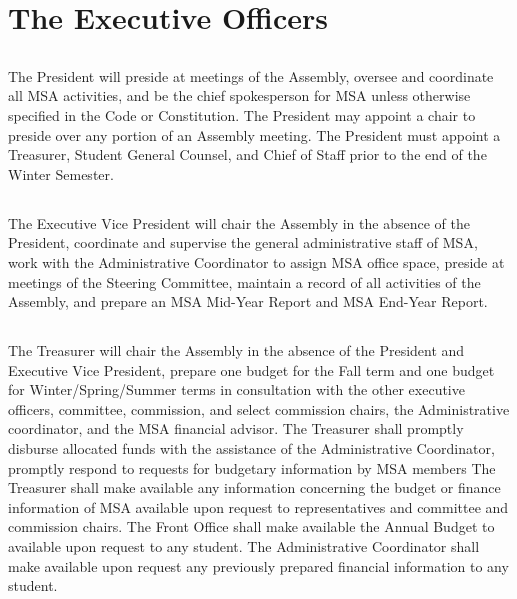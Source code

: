 \article{}

\section{The Executive Officers}

\subsection{}
The President will preside at meetings of the Assembly, oversee and coordinate all MSA activities, and be the chief spokesperson for MSA unless otherwise specified in the Code or Constitution.  The President may appoint a chair to preside over any portion of an Assembly meeting.  The President must appoint a Treasurer, Student General Counsel, and Chief of Staff prior to the end of the Winter Semester.

\subsection{}
The Executive Vice President will chair the Assembly in the absence of the President, coordinate and supervise the general administrative staff of MSA, work with the Administrative Coordinator to assign MSA office space, preside at meetings of the Steering Committee, maintain a record of all activities of the Assembly, and prepare an MSA Mid-Year Report and MSA End-Year Report.

\subsection{}
The Treasurer will chair the Assembly in the absence of the President and Executive Vice President, prepare one budget for the Fall term and one budget for Winter/Spring/Summer terms in consultation with the other executive officers, committee, commission, and select commission chairs, the Administrative coordinator, and the MSA financial advisor. The Treasurer shall promptly disburse allocated funds with the assistance of the Administrative Coordinator, promptly respond to requests for budgetary information by MSA members The Treasurer shall make available any information concerning the budget or finance information of MSA available upon request to representatives and committee and commission chairs. The Front Office shall make available the Annual Budget to available upon request to any student. The Administrative Coordinator shall make available upon request any previously prepared financial information to any student. 

